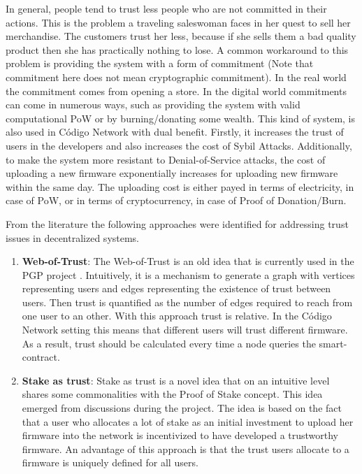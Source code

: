 {{In general, people tend to trust less people who are not committed in their actions. This is the problem a traveling saleswoman faces in her quest to sell her merchandise. The customers trust her less, because if she sells them a bad quality product then she has practically nothing to lose. A common workaround to this problem is providing the system with a form of commitment (Note that commitment here does not mean cryptographic commitment). In the real world the commitment comes from opening a store. In the digital world commitments can come in numerous ways, such as providing the system with valid computational PoW or by burning/donating some wealth. This kind of system, is also used in Código Network with dual benefit. Firstly, it increases the trust of users in the developers and also increases the cost of Sybil Attacks. Additionally, to make the system more resistant to Denial-of-Service attacks, the cost of uploading a new firmware exponentially increases for uploading new firmware within the same day. The uploading cost is either payed in terms of electricity, in case of PoW, or in terms of cryptocurrency, in case of Proof of Donation/Burn.

From the literature the following approaches were identified for addressing trust issues in decentralized systems.
\begin{enumerate}
\item \textbf{Web-of-Trust}: The Web-of-Trust is an old idea that is currently used in the PGP project \cite{ZimmermannPGP}. Intuitively, it is a mechanism to generate a graph with vertices representing users and edges representing the existence of trust between users. Then trust is quantified as the number of edges required to reach from one user to an other. With this approach trust is relative. In the Código Network setting this means that different users will trust different firmware. As a result, trust should be calculated every time a node queries the smart-contract.

\item \textbf{Stake as trust}: Stake as trust is a novel idea that on an intuitive level shares some commonalities with the Proof of Stake concept. This idea emerged from discussions during the project. The idea is based on the fact that a user who allocates a lot of stake as an initial investment to upload her firmware into the network is incentivized to have developed a trustworthy firmware. An advantage of this approach is that the trust users allocate to a firmware is uniquely defined for all users.


\end{enumerate}}}
